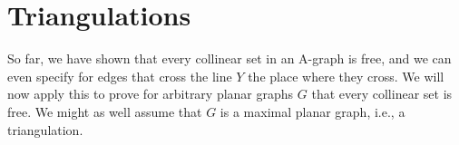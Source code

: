 \section{Triangulations}



So far, we have shown that every collinear set in an A-graph is free,
and we can even specify  for edges that cross the line $Y$ the place
where they cross.
We will now apply this to prove for arbitrary planar graphs $G$
that every collinear set is free.
We might as well assume that $G$ is a maximal planar graph, i.e., a
triangulation.





